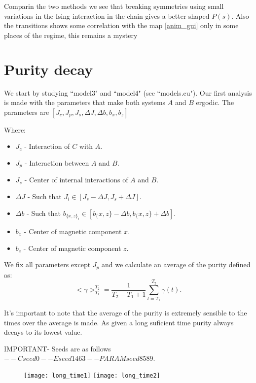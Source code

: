 \documentclass[floatfix]{article}
\begin{document}
Comparin the two methods we see that breaking symmetries using small variations in the Ising interaction in the chain gives
a better shaped $P(s)$. Also the transitions shows some correlation with the map \ref{anim_gui} only in some places of the
regime, this remains a mystery


\section{Purity decay}

We start by studying ``model3" and ``model4" (see ``models.cu"). Our first analysis is made with the parameters that make 
both systems $A$ and $B$ ergodic. The parameters are $[J_c,J_p,J_s,\Delta J,\Delta b, b_x, b_z]$

Where:
\begin{itemize}
\item $J_c$ - Interaction of $C$ with $A$.
\item $J_p$ - Interaction between $A$ and $B$.
\item $J_s$ - Center of internal interactions of $A$ and $B$.
\item $\Delta J$ - Such that $J_i \in [J_s - \Delta J, J_s + \Delta J]$.
\item $\Delta b$ - Such that $b_{{\{x,z\}}_i} \in [b_\{x,z\} - \Delta b, b_\{x,z\} + \Delta b]$.
\item $b_x$ - Center of magnetic component $x$.
\item $b_z$ - Center of magnetic component $z$. 
\end{itemize}

We fix all parameters except $J_p$ and we calculate an average of the purity defined as:
\begin{equation}
<\gamma>_{T_1}^{T_2} = \frac{1}{T_2-T_1+1} \sum_{t=T_1}^{T_2} \gamma(t).
\end{equation}

It's important to note that the average of the purity is extremely sensible to the times over the average is made. 
As given a long suficient time purity always decays to its lowest value.

IMPORTANT- Seeds are as follows $--Cseed 0 --Eseed 1463 --PARAMseed 8589$.

\begin{figure}[H]
\begin{center}
\texttt{[image: long\_time1]}  
\texttt{[image: long\_time2]}  
\end{center}
\caption{}
\label{p_m3}
\end{figure}
\end{document}
